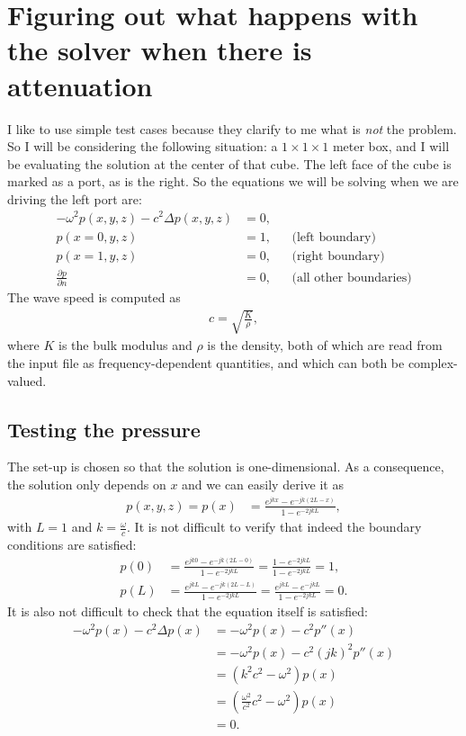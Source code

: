 \documentclass{article}
\begin{document}
\section*{Figuring out what happens with the solver when there is
  attenuation}

I like to use simple test cases because they clarify to me what is
\textit{not} the problem. So I will be considering the following
situation: a $1\times 1\times 1$ meter box, and I will be evaluating
the solution at the center of that cube. The left face of the cube is
marked as a port, as is the right. So the equations we will be
solving when we are driving the left port are:
\begin{align*}
  -\omega^2 p(x,y,z) - c^2 \Delta p(x,y,z) &= 0, \\
  p(x=0,y,z) &= 1, && \text{(left boundary)}\\
  p(x=1,y,z) &= 0, && \text{(right boundary)} \\
    \frac{\partial p}{\partial n} &= 0,
     && \text{(all other boundaries)}
\end{align*}
The wave speed is computed as
\begin{align*}
  c = \sqrt{\frac{K}{\rho}},
\end{align*}
where $K$ is the bulk modulus and $\rho$ is the density, both of which
are read from the input file as frequency-dependent quantities, and
which can both be complex-valued.


\subsection*{Testing the pressure}

The set-up is chosen so that the solution is one-dimensional. As a
consequence, the solution only depends on $x$ and we can easily derive
it as
\begin{align*}
  p(x,y,z) = p(x) &= \frac{e^{jkx} - e^{-jk(2L-x)}}{1 - e^{-2jkL}},
\end{align*}
with $L=1$ and $k=\frac{\omega}{c}$. It is not difficult to verify
that indeed the boundary conditions are satisfied:
\begin{align*}
  p(0) &= \frac{e^{jk0} - e^{-jk(2L-0)}}{1 - e^{-2jkL}}
  =
  \frac{1 - e^{-2jkL}}{1 - e^{-2jkL}} = 1,
  \\
  p(L) &= \frac{e^{jkL} - e^{-jk(2L-L)}}{1 - e^{-2jkL}}
  = \frac{e^{jkL} - e^{-jkL}}{1 - e^{-2jkL}} = 0.
\end{align*}
It is also not difficult to check that the equation itself is
satisfied:
\begin{align*}
  -\omega^2 p(x) - c^2 \Delta p(x)
  &= -\omega^2 p(x) - c^2 p''(x)\\
  &= -\omega^2 p(x) - c^2 (jk)^2 p''(x)  \\
  &= (k^2c^2-\omega^2) p(x) \\
  &= \left(\frac{\omega^2}{c^2}c^2-\omega^2\right) p(x)\\
  &= 0.
\end{align*}
\end{document}
